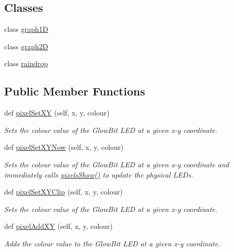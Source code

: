 \subsection*{Classes}
\begin{DoxyCompactItemize}
\item 
class \hyperlink{classglowbit_1_1glowbitMatrix_1_1graph1D}{graph1D}
\item 
class \hyperlink{classglowbit_1_1glowbitMatrix_1_1graph2D}{graph2D}
\item 
class \hyperlink{classglowbit_1_1glowbitMatrix_1_1raindrop}{raindrop}
\end{DoxyCompactItemize}
\subsection*{Public Member Functions}
\begin{DoxyCompactItemize}
\item 
def \hyperlink{classglowbit_1_1glowbitMatrix_a5f20884e1b08bc66e54860d0bbf0d22e}{pixel\+Set\+XY} (self, x, y, colour)
\begin{DoxyCompactList}\small\item\em Sets the colour value of the Glow\+Bit L\+ED at a given x-\/y coordinate. \end{DoxyCompactList}\item 
def \hyperlink{classglowbit_1_1glowbitMatrix_ab100bb891bab3d6479b066049ce9a367}{pixel\+Set\+X\+Y\+Now} (self, x, y, colour)
\begin{DoxyCompactList}\small\item\em Sets the colour value of the Glow\+Bit L\+ED at a given x-\/y coordinate and immediately calls \hyperlink{classglowbit_1_1glowbit_a051aed2a4969fdcb0466e4e840209279}{pixels\+Show()} to update the physical L\+E\+Ds. \end{DoxyCompactList}\item 
def \hyperlink{classglowbit_1_1glowbitMatrix_af33f1952a94e2f0933386ae2e7c5bca4}{pixel\+Set\+X\+Y\+Clip} (self, x, y, colour)
\begin{DoxyCompactList}\small\item\em Sets the colour value of the Glow\+Bit L\+ED at a given x-\/y coordinate. \end{DoxyCompactList}\item 
def \hyperlink{classglowbit_1_1glowbitMatrix_ae05d008c207c5f5219e737d29185501e}{pixel\+Add\+XY} (self, x, y, colour)
\begin{DoxyCompactList}\small\item\em Adds the colour value to the Glow\+Bit L\+ED at a given x-\/y coordinate. \end{DoxyCompactList}\item 

\end{DoxyCompactItemize}

